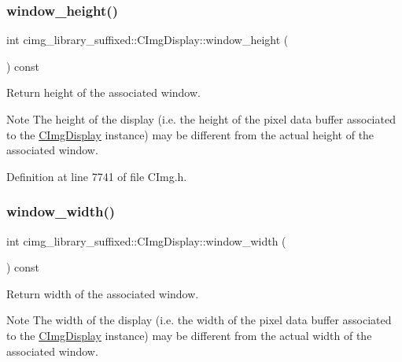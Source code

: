 \subsubsection{\texorpdfstring{window\+\_\+height()}{window\_height()}}
{\footnotesize\ttfamily int cimg\+\_\+library\+\_\+suffixed\+::\+C\+Img\+Display\+::window\+\_\+height (\begin{DoxyParamCaption}{ }\end{DoxyParamCaption}) const\hspace{0.3cm}{\ttfamily [inline]}}



Return height of the associated window. 

\begin{DoxyNote}{Note}
The height of the display (i.\+e. the height of the pixel data buffer associated to the \hyperlink{structcimg__library__suffixed_1_1CImgDisplay}{C\+Img\+Display} instance) may be different from the actual height of the associated window. 
\end{DoxyNote}


Definition at line 7741 of file C\+Img.\+h.

\mbox{\label{structcimg__library__suffixed_1_1CImgDisplay_a7adf8a88e9cf55f7f394801df0a0e555}} 
\subsubsection{\texorpdfstring{window\+\_\+width()}{window\_width()}}
{\footnotesize\ttfamily int cimg\+\_\+library\+\_\+suffixed\+::\+C\+Img\+Display\+::window\+\_\+width (\begin{DoxyParamCaption}{ }\end{DoxyParamCaption}) const\hspace{0.3cm}{\ttfamily [inline]}}



Return width of the associated window. 

\begin{DoxyNote}{Note}
The width of the display (i.\+e. the width of the pixel data buffer associated to the \hyperlink{structcimg__library__suffixed_1_1CImgDisplay}{C\+Img\+Display} instance) may be different from the actual width of the associated window. 
\end{DoxyNote}


